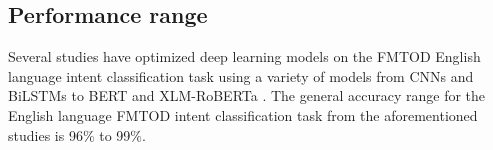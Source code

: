 \subsection{Performance range}

Several studies have optimized deep learning models on the FMTOD English language intent classification task using a variety of models from CNNs and BiLSTMs to BERT and XLM-RoBERTa \citep{schuster-etal-2019-cross-lingual,zhang2019joint,zhang2020intent,ren2020intention}. The general accuracy range for the English language FMTOD intent classification task from the aforementioned studies is 96$\%$ to 99$\%$. 

